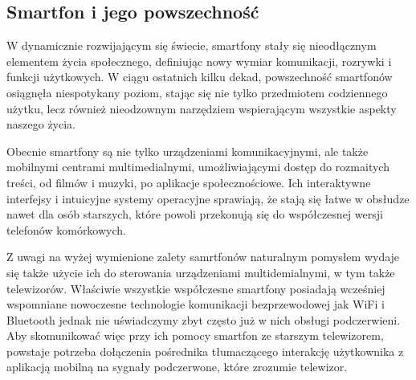 \documentclass[12pt,twoside]{article}
\begin{document}
\subsection{Smartfon i jego powszechność}
{W dynamicznie rozwijającym się świecie, smartfony stały się nieodłącznym elementem życia społecznego, 
definiując nowy wymiar komunikacji, rozrywki i funkcji użytkowych. 
W ciągu ostatnich kilku dekad, powszechność smartfonów osiągnęła niespotykany poziom, 
stając się nie tylko przedmiotem codziennego użytku, lecz również nieodzownym 
narzędziem wspierającym wszystkie aspekty naszego życia.

Obecnie smartfony są nie tylko urządzeniami komunikacyjnymi, ale także mobilnymi centrami multimedialnymi,
 umożliwiającymi dostęp do rozmaitych treści, od filmów i muzyki, po aplikacje społecznościowe. 
 Ich interaktywne interfejsy i intuicyjne systemy operacyjne sprawiają, że stają się łatwe w obsłudze nawet dla osób starszych, 
 które powoli przekonują się do współczesnej wersji telefonów komórkowych.

 Z uwagi na wyżej wymienione zalety samrtfonów naturalnym pomysłem wydaje się także użycie ich do 
 sterowania urządzeniami multidemialnymi, w tym także telewizorów. Właściwie wszystkie współczesne smartfony posiadają 
 wcześniej wspomniane nowoczesne technologie komunikacji bezprzewodowej jak WiFi i Bluetooth jednak nie uświadczymy
 zbyt często już w nich obsługi podczerwieni. Aby skomunikować więc przy ich pomocy smartfon
 ze starszym telewizorem, powstaje potrzeba dołączenia pośrednika tłumaczącego interakcję 
 użytkownika z aplikacją mobilną na sygnały podczerwone, które zrozumie telewizor.}
\end{document}
